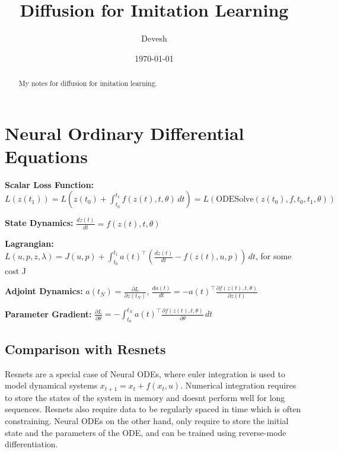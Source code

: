 \documentclass[12pt]{article}
\begin{document}
\title{Diffusion for Imitation Learning}
\author{Devesh}
\date{\today}

\maketitle

\begin{abstract}
My notes for diffusion for imitation learning.
\end{abstract}

\section{Neural Ordinary Differential Equations}
\textbf{Scalar Loss Function:} $L(z(t_1)) = L\left(z(t_0) + \int_{t_0}^{t_1} f(z(t), t, \theta) \, dt\right) = L(\mathrm{ODESolve}(z(t_0), f, t_0, t_1, \theta))$

\textbf{State Dynamics:} $\frac{dz(t)}{dt} = f(z(t), t, \theta)$

\textbf{Lagrangian:} $L(u, p, z, \lambda) = J(u, p) + \int_{t_0}^{t_1} a(t)^\top \left( \frac{dz(t)}{dt} - f(z(t), u, p) \right) \, dt$, for some cost J

\textbf{Adjoint Dynamics:} \(a(t_N) = \frac{\partial L}{\partial z(t_N)}\), $\frac{da(t)}{dt} = -a(t)^\top \frac{\partial f(z(t), t, \theta)}{\partial z(t)}$

\textbf{Parameter Gradient:} $\frac{\partial L}{\partial \theta} = -\int_{t_0}^{t_N} a(t)^\top \frac{\partial f(z(t), t, \theta)}{\partial \theta} \, dt$

\subsection{Comparison with Resnets}
Resnets are a special case of Neural ODEs, where euler integration is used to model dynamical systems $x_{t+1} = x_{t} + f(x_{t}, u)$. Numerical integration requires to store the states of the system in memory and doesnt perform well for long sequences. 
Resnets also require data to be regularly spaced in time which is often constraining. Neural ODEs on the other hand, only require to store the initial state and the parameters of the ODE, and can be trained using reverse-mode differentiation.
\end{document}
